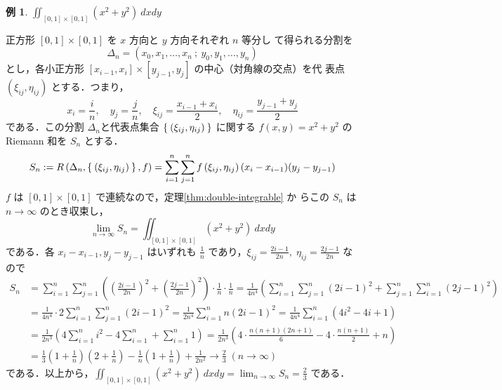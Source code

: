 \documentclass[10pt, uplatex, dvipdfmx]{jsarticle}
\theoremstyle{definition}
\newtheorem{example}[theorem]{例}
\numberwithin{equation}{section}
\newcommand{\ds}{\displaystyle}
\begin{document}
\begin{example}
  $\ds \iint_{[0,1] \times [0,1]} \left( x^2+y^2\right) \ dx dy$

  \vspace{1zh}
  
  正方形 $[0,1]\times [0,1]$ を $x$ 方向と $y$ 方向それぞれ $n$ 等分し
  て得られる分割を
  \[
    \Delta_n = \left( x_0, x_1, \ldots, x_n \ ; \ y_0, y_1, \ldots,
      y_n\right)
  \]
  とし，各小正方形 $[x_{i-1}, x_{i}] \times [y_{j-1}, y_{j}]$ の中心（対角線の交点）を代
  表点 $\left( \xi_{ij}, \eta_{ij}\right)$ とする．つまり，
  \[
    x_i = \frac{i}{n}, \quad y_j = \frac{j}{n}, \quad \xi_{ij} =
    \frac{x_{i-1}+x_{i}}{2}, \quad \eta_{ij}=\frac{y_{j-1}+y_{j}}{2}
  \]
  である．この分割 $\Delta_n$と代表点集合 $\Set{\left( \xi_{ij},
      \eta_{ij}\right)}$ に関する $f(x,y) =
  x^2+y^2$ の Riemann 和を $S_n$ とする．
  \[
    S_n := R \left(\Delta_n, \Set{\left( \xi_{ij}, \eta_{ij}\right)}, f \right)
    = \sum_{i=1}^{n} \sum_{j=1}^{n} f\left( \xi_{ij}, \eta_{ij}\right) (x_i-x_{i-1})(y_{j}-y_{j-1})
  \]
  $f$ は $[0,1] \times [0,1]$ で連続なので，定理\ref{thm:double-integrable} か
  らこの $S_n$ は $n \to \infty$ のとき収束し，
  \[
      \lim_{n \to \infty} S_n = \iint_{[0,1] \times [0,1]} (x^2+y^2) \ dx dy
  \]
  である．各 $x_{i}-x_{i-1}, y_{j}- y_{j-1}$ はいずれも $\ds
  \frac{1}{n}$
  であり，$\ds \xi_{ij} = \frac{2i-1}{2n}, \; \eta_{ij} =
  \frac{2j-1}{2n}$ なので
  \[
    \begin{aligned}
      S_n &= \sum_{i=1}^{n} \sum_{j=1}^{n} \left(\left(\frac{2i-1}{2n}\right)^2
            + \left(\frac{2j-1}{2n}\right)^2\right) \cdot \frac{1}{n} \cdot \frac{1}{n}
            = \frac{1}{4n^4} \left( \sum_{i=1}^{n} \sum_{j=1}^{n} (2i-1)^2
            + \sum_{j=1}^{n} \sum_{i=1}^{n} (2j-1)^2\right)\\[1ex]
          &= \frac{1}{4n^4} \cdot 2 \sum_{i=1}^{n}\sum_{j=1}^{n} (2i-1)^2 = \frac{1}{2n^4} \sum_{i=1}^{n} n (2i-1)^2
            = \frac{1}{4n^4} \sum_{i=1}^{n} \left( 4i^2-4i+1\right)\\[1ex]
          &=\frac{1}{2n^3} \left( 4 \sum_{i=1}^{n} i^2 - 4 \sum_{i=1}^{n} + \sum_{i=1}^{n}1\right)
            = \frac{1}{2n^3} \left( 4 \cdot \frac{n(n+1)(2n+1)}{6} - 4 \cdot \frac{n(n+1)}{2} + n \right)\\[1ex]
          &= \frac{1}{3}\left(1+\frac{1}{n}\right)\left(2+\frac{1}{n}\right) - \frac{1}{n}\left(1+\frac{1}{n}\right)
            + \frac{1}{2n^2} \to \frac{2}{3} \; (n \to \infty)
    \end{aligned}
  \]
  である．以上から，$\ds \iint_{[0,1] \times [0,1]} (x^2+y^2) \ dx dy = \lim_{n \to \infty} S_n = \frac{2}{3}$ である．
\end{example}
\end{document}
